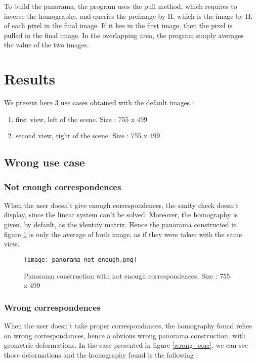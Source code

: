\documentclass[12pt,a4paper,onecolumn]{article}
\begin{document}
To build the panorama, the program uses the pull method, which requires to inverse the homography, and queries the preimage by H, which is the image by H, of each pixel in the final image. If it lies in the first image, then the pixel is pulled in the final image. In the overlapping area, the program simply averages the value of the two images.

\section{Results}
We present here 3 use cases obtained with the default images :
\begin{enumerate}
	\item first view, left of the scene. Size : 755 x 499
	\item second view, right of the scene. Size : 755 x 499
\end{enumerate}

\subsection{Wrong use case}

\subsubsection{Not enough correspondences}

When the user doesn't give enough correspondences, the sanity check doesn't display, since the linear system can't be solved. Moreover, the homography is given, by default, as the identity matrix. Hence the panorama constructed in figure \ref{not_enough} is only the average of both image, as if they were taken with the same view.
\begin{figure}[H]
	\begin{center}
		\texttt{[image: panorama\_not\_enough.png]}
	\end{center}
	\caption{Panorama construction with not enough correspondences. Size : 755 x 499}
	\label{not_enough}
\end{figure}

\subsubsection{Wrong correspondences}

When the user doesn't take proper correspondances, the homography found relies on wrong correspondances, hence a obvious wrong panorama construction, with geometric deformations.
In the case presented in figure \ref{wrong_corr}, we can see those deformations and the homography found is the following :
\end{document}
